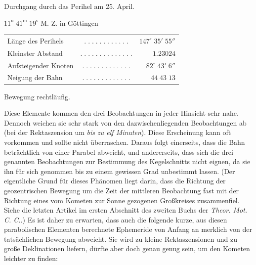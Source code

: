 \begin{center}\fontsize{10}{12}\selectfont Durchgang durch das Perihel am 25. April.\par $11^{\mathrm u}\;41^{\mathrm m}\;19^{\mathrm s}$ M. Z. in Göttingen\end{center}
\begin{center}\fontsize{10}{12}\selectfont\setlength{\tabcolsep}{3pt}\renewcommand{\arraystretch}{1.15}\begin{tabular}{lcr}
Länge des Perihels & $.\;.\;.\;.\;.\;.\;.\;.\;.\;.\;.\;.$ & $147^\circ\;35'\;55''$\\
Kleinster Abstand & $.\;.\;.\;.\;.\;.\;.\;.\;.\;.\;.\;.\;.\;.$ & $1.23024$\\
Aufsteigender Knoten & $.\;.\;.\;.\;.\;.\;.\;.\;.\;.\;.\;.\;.$ & $82^\circ\;43'\;6''$\\
Neigung der Bahn & $.\;.\;.\;.\;.\;.\;.\;.\;.\;.\;.\;.\;.$ & $44\;43\;13$\\
\end{tabular}\end{center}\begin{center}Bewegung rechtläufig.\end{center}

\par\indent Diese Elemente kommen den drei Beobachtungen in jeder Hinsicht sehr nahe. Dennoch weichen sie sehr stark von den dazwischenliegenden Beobachtungen ab (bei der Rektaszension um \emph{bis zu elf Minuten}). Diese Erscheinung kann oft vorkommen und sollte nicht überraschen. Daraus folgt einerseits, dass die Bahn beträchtlich von einer Parabel abweicht, und andererseits, dass sich die drei genannten Beobachtungen zur Bestimmung des Kegelschnitts nicht eignen, da sie ihn für sich genommen bis zu einem gewissen Grad unbestimmt lassen. (Der eigentliche Grund für dieses Phänomen liegt darin, dass die Richtung der geozentrischen Bewegung um die Zeit der mittleren Beobachtung fast mit der Richtung eines vom Kometen zur Sonne gezogenen Großkreises zusammenfiel. Siehe die letzten Artikel im ersten Abschnitt des zweiten Buchs der \emph{Theor. Mot. C. C.}.) Es ist daher zu erwarten, dass auch die folgende kurze, aus diesen parabolischen Elementen berechnete Ephemeride von Anfang an merklich von der tatsächlichen Bewegung abweicht. Sie wird zu kleine Rektaszensionen und zu große Deklinationen liefern, dürfte aber doch genau genug sein, um den Kometen leichter zu finden:

